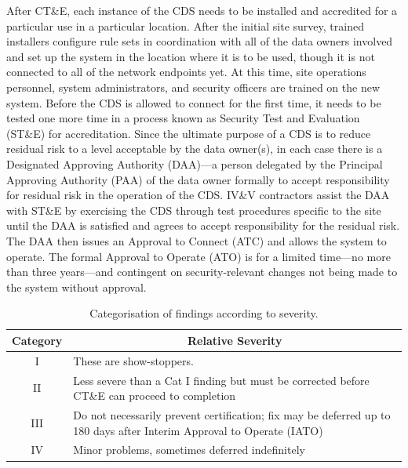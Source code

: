 \documentclass[10pt,letterpaper,conference,compsocconf]{IEEEtran}
\begin{document}
After CT\&E, each instance of the CDS needs to be installed and accredited for
a particular use in a particular location.  After the initial site
survey, trained installers configure rule sets in coordination with
all of the data owners involved and set up the system in the location where
it is to be used, though it is not connected to all of the network endpoints yet.
At this time, site operations personnel, system administrators,
and security officers are trained on the new system.  Before the
CDS is allowed to connect for the first time, it needs to be tested one
more time in a process known as Security Test and Evaluation (ST\&E)
for accreditation.
Since the ultimate purpose of a CDS is to reduce residual risk to a
level acceptable by the data owner(s), in each case there is a Designated Approving Authority
(DAA)---a person delegated by the Principal Approving Authority (PAA)
of the data owner formally to accept responsibility for residual
risk in the operation of the CDS.  IV\&V contractors assist the DAA with
ST\&E by exercising the CDS through test procedures specific to the site
until the DAA is
satisfied and agrees to accept responsibility for the residual risk.
The DAA then issues an Approval to Connect (ATC) and allows the system
to operate.  The formal Approval to Operate (ATO) is for a limited
time---no more than three years---and contingent on security-relevant
changes not being made to the system without approval.

\begin{table}[!t]
	\renewcommand{\arraystretch}{2.0}


	\caption{Categorisation of findings according to severity.}
	\label{table:findings}
	\centering
	\begin{tabular}{|c|l|}
		\hline
		{\bf Category} & \multicolumn{1}{c|}{\bf Relative Severity} \\ 
		\hline
		I & These are show-stoppers. \\
		\hline
		II & %
			\begin{minipage}{0.35\textwidth}
				\vspace{1mm}Less severe than a Cat I finding but must be
				corrected before CT\&E can proceed to completion\vspace{1mm}
			\end{minipage} \\
		\hline
		III & %
			\begin{minipage}{0.35\textwidth}
				\vspace{1mm}Do not necessarily prevent certification; fix may
				be deferred up to 180 days after Interim Approval
				to Operate (IATO)\vspace{1mm}
			\end{minipage} \\
		\hline
		IV & Minor problems, sometimes deferred indefinitely \\
		\hline
	\end{tabular}
\end{table}
\end{document}
